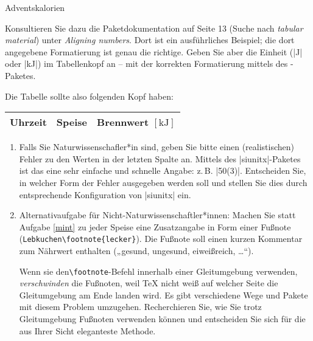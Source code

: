 \documentclass[
	vorläufig=false, 
	blattnr=4,
	ausgabe=2021-11-17,
	abgabe=2021-11-24,
	lösung=true,
	shortverb,
]{../tex/latexkurs-exercise}
\begin{document}
\begin{aufgabe}[12]{Adventskalorien}
\begin{enumerate}[label=\alph*)]
Konsultieren Sie dazu die Paketdokumentation auf Seite 13 (Suche nach \emph{tabular material}) unter \emph{Aligning numbers}. Dort ist ein ausführliches Beispiel; die dort angegebene Formatierung ist genau die richtige. Geben Sie aber die Einheit (|J| oder |kJ|) im Tabellenkopf an – mit der korrekten Formatierung mittels des -Paketes.
	\end{enumerate}
	Die Tabelle sollte also folgenden Kopf haben:
	\begin{table}[h]
		\centering
		\begin{tabular}{lll}
			\toprule
			Uhrzeit & Speise & Brennwert $[\mathrm{kJ}]$\\
			\midrule
		\end{tabular}
	\end{table}
	\begin{enumerate}[resume, label=\alph*)]
		\item \label{mint} Falls Sie Naturwissenschafler*in sind, geben Sie bitte einen (realistischen) Fehler zu den Werten in der letzten Spalte an. Mittels des |siunitx|-Paketes ist das eine sehr einfache und schnelle Angabe: z.\,B. |50(3)|. Entscheiden Sie, in welcher Form der Fehler ausgegeben werden soll und stellen Sie dies durch entsprechende Konfiguration von |siunitx| ein.
		\item Alternativaufgabe für Nicht-Naturwissenschaftler*innen: Machen Sie statt Aufgabe \ref{mint} zu jeder Speise eine Zusatzangabe in Form einer Fußnote (\texttt{Lebkuchen\textbackslash footnote\{lecker\}}). Die Fußnote soll einen kurzen Kommentar zum Nährwert enthalten („gesund, ungesund, eiweißreich, …“).
		
		Wenn sie den\texttt{\textbackslash footnote}-Befehl innerhalb einer Gleitumgebung verwenden, \emph{verschwinden} die Fußnoten, weil \TeX{} nicht weiß auf welcher Seite die Gleitumgebung am Ende landen wird. Es gibt verschiedene Wege und Pakete mit diesem Problem umzugehen. Recherchieren Sie, wie Sie trotz Gleitumgebung Fußnoten verwenden können und entscheiden Sie sich für die aus Ihrer Sicht eleganteste Methode.
	\end{enumerate}
\end{aufgabe}

\clearpage
{}
\end{document}
